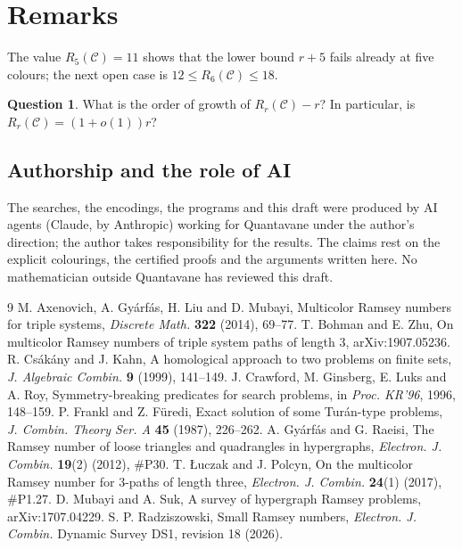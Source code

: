 \documentclass[11pt]{amsart}
\theoremstyle{definition}
\newtheorem{question}[theorem]{Question}
\theoremstyle{remark}
\newcommand{\C}{\mathcal{C}}
\begin{document}
\section{Remarks}

The value $R_5(\C)=11$ shows that the lower bound $r+5$ fails already at five colours; the next open case is
$12\le R_6(\C)\le18$.

\begin{question}
What is the order of growth of $R_r(\C)-r$? In particular, is $R_r(\C)=(1+o(1))r$?
\end{question}

\subsection*{Authorship and the role of AI}
The searches, the encodings, the programs and this draft were produced by AI agents (Claude, by Anthropic) working for
Quantavane under the author's direction; the author takes responsibility for the results. The claims rest on the explicit
colourings, the certified proofs and the arguments written here. No mathematician outside Quantavane has reviewed this draft.

\begin{thebibliography}{9}
 M. Axenovich, A. Gy\'arf\'as, H. Liu and D. Mubayi, Multicolor Ramsey numbers for triple systems,
\emph{Discrete Math.} \textbf{322} (2014), 69--77.
 T. Bohman and E. Zhu, On multicolor Ramsey numbers of triple system paths of length 3,
arXiv:1907.05236.
 R. Cs\'ak\'any and J. Kahn, A homological approach to two problems on finite sets,
\emph{J. Algebraic Combin.} \textbf{9} (1999), 141--149.
 J. Crawford, M. Ginsberg, E. Luks and A. Roy, Symmetry-breaking predicates for search problems,
in \emph{Proc. KR'96}, 1996, 148--159.
 P. Frankl and Z. F\"uredi, Exact solution of some Tur\'an-type problems,
\emph{J. Combin. Theory Ser. A} \textbf{45} (1987), 226--262.
 A. Gy\'arf\'as and G. Raeisi, The Ramsey number of loose triangles and quadrangles in hypergraphs,
\emph{Electron. J. Combin.} \textbf{19}(2) (2012), \#P30.
 T. \L uczak and J. Polcyn, On the multicolor Ramsey number for 3-paths of length three,
\emph{Electron. J. Combin.} \textbf{24}(1) (2017), \#P1.27.
 D. Mubayi and A. Suk, A survey of hypergraph Ramsey problems, arXiv:1707.04229.
 S. P. Radziszowski, Small Ramsey numbers, \emph{Electron. J. Combin.} Dynamic Survey DS1, revision 18
(2026).
\end{thebibliography}
\end{document}

